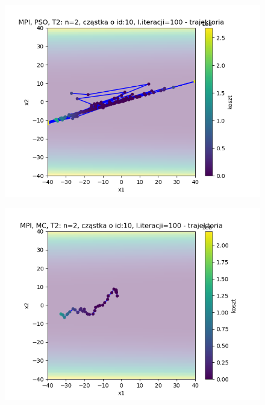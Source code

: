 \documentclass[11pt, a4paper, oneside]{article}
\begin{document}
\begin{figure}[H]
\centering
\begin{minipage}[b]{\dimexpr.5\textwidth-1em}
  \centering
  \includegraphics[width=1\linewidth]{grafiki2/MPI_PSO_T2/MPI_ PSO_T2_trajectory_id10.png}
  \label{fig:trajektoriaWybrana:PSO2}
\end{minipage} \hfill
\begin{minipage}[b]{\dimexpr.5\textwidth-1em}
  \centering
  \includegraphics[width=1\linewidth]{grafiki2/MPI_MC_T2/MPI_ MC_T2_trajectory_id10.png}
  \label{fig:trajektoriaWybrana:MC2}
\end{minipage}
\end{figure}
\end{document}
